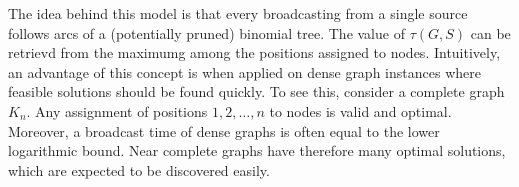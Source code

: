 The idea behind this model is that every broadcasting from a single source follows arcs of a (potentially pruned) binomial tree.
The value of $\tau(G,S)$ can be retrievd from the maximumg among the positions assigned to nodes.
Intuitively, an advantage of this concept is when applied on dense graph instances where feasible solutions should be found quickly.
To see this, consider a complete graph $K_n$.
Any assignment of positions $1,2,\dots,n$ to nodes is valid and optimal. 
Moreover, a broadcast time of dense graphs is often equal to the lower logarithmic bound.
Near complete graphs have therefore many optimal solutions, which are expected to be discovered easily.

